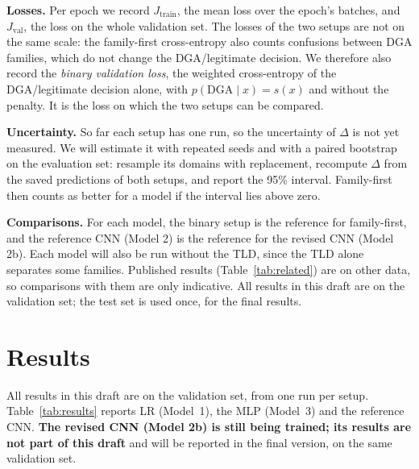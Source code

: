 \documentclass[11pt]{article}
\begin{document}
\textbf{Losses.} Per epoch we record $J_{\text{train}}$, the mean loss over the
epoch's batches, and $J_{\text{val}}$, the loss on the whole validation set. The
losses of the two setups are not on the same scale: the family-first cross-entropy
also counts confusions between DGA families, which do not change the
DGA/legitimate decision. We therefore also record the \emph{binary validation
loss}, the weighted cross-entropy of the DGA/legitimate decision alone, with
$p(\text{DGA} \mid x) = s(x)$ and without the penalty. It is the loss on which the
two setups can be compared.

\textbf{Uncertainty.} So far each setup has one run, so the uncertainty of $\Delta$
is not yet measured. We will estimate it with repeated seeds and with a paired
bootstrap on the evaluation set: resample its domains with replacement, recompute
$\Delta$ from the saved predictions of both setups, and report the 95\% interval.
Family-first then counts as better for a model if the interval lies above zero.

\textbf{Comparisons.} For each model, the binary setup is the reference for
family-first, and the reference CNN (Model 2) is the reference for the revised CNN
(Model 2b). Each model will also be run without the TLD, since the TLD alone
separates some families. Published results (Table~\ref{tab:related}) are on other
data, so comparisons with them are only indicative. All results in this draft are
on the validation set; the test set is used once, for the final results.

\section{Results}\label{sec:results}
All results in this draft are on the validation set, from one run per setup.
Table~\ref{tab:results} reports LR (Model~1), the MLP (Model~3) and the reference CNN. \textbf{The revised CNN
(Model 2b) is still being trained; its results are not part of this draft} and
will be reported in the final version, on the same validation set.
\end{document}

